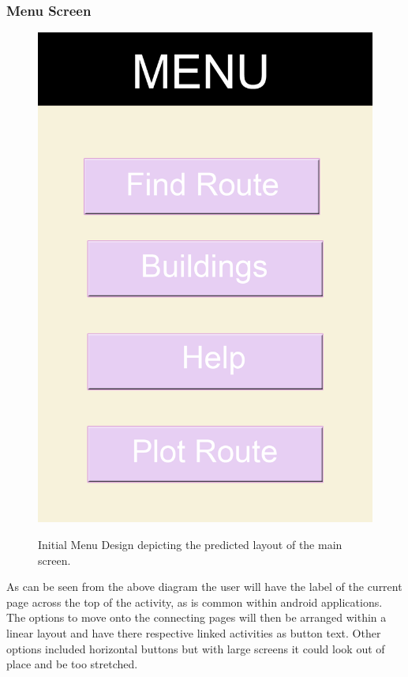 \subsubsection{Menu Screen}
\begin{figure}[h]
\includegraphics[scale=0.6]{Design/Menu.png}\\
\caption[Initial Menu Design]{Initial Menu Design depicting the predicted layout of the main screen.}
\end{figure}

As can be seen from the above diagram the user will have the label of the current page across the top of the activity, as is common within android applications. The options to move onto the connecting pages will then be arranged within a linear layout and have there respective linked activities as button text. Other options included horizontal buttons but with large screens it could look out of place and be too stretched.

